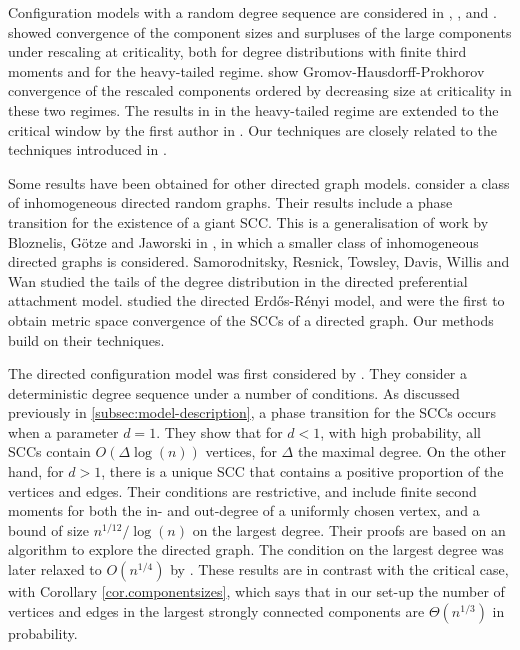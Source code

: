 Configuration models with a random degree sequence are considered in \cite{josephComponentSizesCritical2014}, \cite{conchon--kerjanStableGraphMetric2020}, and \cite{Donderwinkel2021heightprocess}. \citet{josephComponentSizesCritical2014} showed convergence of the component sizes and surpluses of the large components under rescaling at criticality, both for degree distributions with finite third moments and for the heavy-tailed regime. \citet{conchon--kerjanStableGraphMetric2020} show Gromov-Hausdorff-Prokhorov convergence of the rescaled components ordered by decreasing size at criticality in these two regimes. The results in \cite{conchon--kerjanStableGraphMetric2020} in the heavy-tailed regime are extended to the critical window by the first author in \cite{Donderwinkel2021heightprocess}. Our techniques are closely related to the techniques introduced in \cite{conchon--kerjanStableGraphMetric2020}. 

Some results have been obtained for other directed graph models. \citet{caoConnectivityGeneralClass2019} consider a class of inhomogeneous directed random graphs. Their results include a phase transition for the existence of a giant SCC. This is a generalisation of work by Bloznelis, Götze and Jaworski in \cite{Bloznelis2012}, in which a smaller class of inhomogeneous directed graphs is considered. Samorodnitsky, Resnick, Towsley, Davis, Willis and Wan \cite{Samorodnitsky2016} studied the tails of the degree distribution in the directed preferential attachment model. \citet{goldschmidtScalingLimitCritical2019} studied the directed Erd\H{o}s-R\'enyi model, and were the first to obtain metric space convergence of the SCCs of a directed graph. Our methods build on their techniques.

The directed configuration model was first considered by \citet{cooperSizeLargestStrongly2004}. They consider a deterministic degree sequence under a number of conditions. As discussed previously in \cref{subsec:model-description}, a phase transition for the SCCs occurs when a parameter $d=1$. They show that for $d<1$, with high probability, all SCCs contain $O(\Delta\log(n))$ vertices, for $\Delta$ the maximal degree. On the other hand, for $d>1$, there is a unique SCC that contains a positive proportion of the vertices and edges. Their conditions are restrictive, and include finite second moments for both the in- and out-degree of a uniformly chosen vertex, and a bound of size $n^{1/12}/\log(n)$ on the largest degree. Their proofs are based on an algorithm to explore the directed graph. The condition on the largest degree was later relaxed to $O(n^{1/4})$ by \citet{Graf2016}. These results are in contrast with the critical case, with Corollary \ref{cor.componentsizes}, which says that in our set-up the number of vertices and edges in the largest strongly connected components are $\Theta(n^{1/3})$ in probability.


